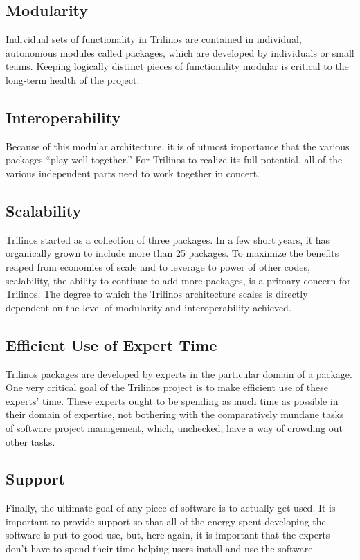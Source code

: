 \documentclass[12pt,relax]{article}
\begin{document}
\subsection{Modularity}
Individual sets of functionality in Trilinos are contained in individual,
autonomous modules called packages, which are developed by individuals or small
teams.  Keeping logically distinct pieces of functionality modular is critical
to the long-term health of the project.  

\subsection{Interoperability}
Because of this modular architecture, it is of utmost importance that the
various packages ``play well together.''  For Trilinos to realize its full
potential, all of the various independent parts need to work together in
concert.

\subsection{Scalability}
Trilinos started as a collection of three packages.  In a few short years, it
has organically grown to include more than 25 packages.  To maximize the
benefits reaped from economies of scale and to leverage to power of other
codes, scalability, the ability to continue to add more packages, is a primary
concern for Trilinos.  The degree to which the Trilinos architecture scales
is directly dependent on the level of modularity and interoperability achieved.

\subsection{Efficient Use of Expert Time}
Trilinos packages are developed by experts in the particular domain of a
package.  One very critical goal of the Trilinos project is to make efficient
use of these experts' time.  These experts ought to be spending as much time as
possible in their domain of expertise, not bothering with the comparatively
mundane tasks of software project management, which, unchecked, have a way of
crowding out other tasks.

\subsection{Support}
Finally, the ultimate goal of any piece of software is to actually get used.  
It is important to provide support so that all of the energy spent developing
the software is put to good use, but, here again, it is important that the
experts don't have to spend their time helping users install and use the
software.
\end{document}
